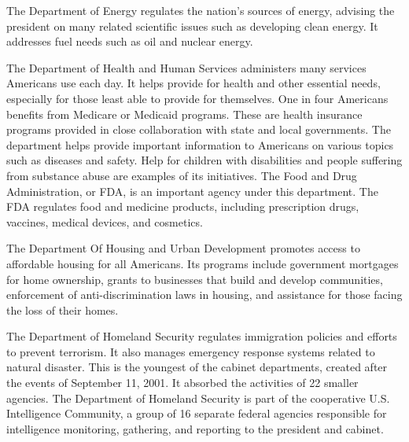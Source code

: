 \begin{definition}
    The Department of Energy regulates the nation's sources of energy, advising
    the president on many related scientific issues such as developing clean
    energy. It addresses fuel needs such as oil and nuclear energy.
\end{definition}

\begin{definition}
    The Department of Health and Human Services administers many services
    Americans use each day. It helps provide for health and other essential
    needs, especially for those least able to provide for themselves. One in
    four Americans benefits from Medicare or Medicaid programs. These are health
    insurance programs provided in close collaboration with state and local
    governments. The department helps provide important information to Americans
    on various topics such as diseases and safety. Help for children with
    disabilities and people suffering from substance abuse are examples of its
    initiatives. The Food and Drug Administration, or FDA, is an important
    agency under this department. The FDA regulates food and medicine products,
    including prescription drugs, vaccines, medical devices, and cosmetics.
\end{definition}

\begin{definition}
    The Department Of Housing and Urban Development promotes access to
    affordable housing for all Americans. Its programs include government
    mortgages for home ownership, grants to businesses that build and develop
    communities, enforcement of anti-discrimination laws in housing, and
    assistance for those facing the loss of their homes.
\end{definition}

\begin{definition}
    The Department of Homeland Security regulates immigration policies and
    efforts to prevent terrorism. It also manages emergency response systems
    related to natural disaster. This is the youngest of the cabinet
    departments, created after the events of September 11, 2001. It absorbed the
    activities of 22 smaller agencies. The Department of Homeland Security is
    part of the cooperative U.S. Intelligence Community, a group of 16 separate
    federal agencies responsible for intelligence monitoring, gathering, and
    reporting to the president and cabinet.
\end{definition}

